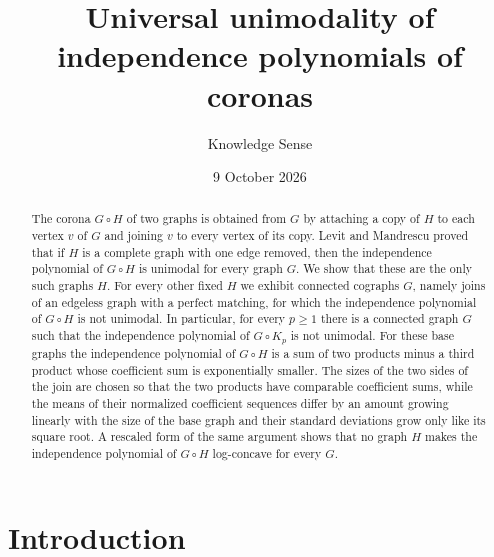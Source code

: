 \documentclass[11pt]{amsart}
\theoremstyle{remark}
\numberwithin{equation}{section}
\newcommand{\cor}{\circ}
\begin{document}
\title{Universal unimodality of independence polynomials of coronas}

\author{Knowledge Sense}
\address{Knowledge Sense}

\date{9 October 2026}



\begin{abstract}
The corona $G\cor H$ of two graphs is obtained from $G$ by attaching a copy of $H$ to each vertex $v$ of $G$ and joining $v$ to every vertex of its copy. Levit and Mandrescu proved that if $H$ is a complete graph with one edge removed, then the independence polynomial of $G\cor H$ is unimodal for every graph $G$. We show that these are the only such graphs $H$. For every other fixed $H$ we exhibit connected cographs $G$, namely joins of an edgeless graph with a perfect matching, for which the independence polynomial of $G\cor H$ is not unimodal. In particular, for every ${p\ge 1}$ there is a connected graph $G$ such that the independence polynomial of $G\cor K_p$ is not unimodal. For these base graphs the independence polynomial of $G\cor H$ is a sum of two products minus a third product whose coefficient sum is exponentially smaller. The sizes of the two sides of the join are chosen so that the two products have comparable coefficient sums, while the means of their normalized coefficient sequences differ by an amount growing linearly with the size of the base graph and their standard deviations grow only like its square root. A rescaled form of the same argument shows that no graph $H$ makes the independence polynomial of $G\cor H$ log-concave for every $G$.
\end{abstract}

\maketitle

\section{Introduction}
\end{document}
